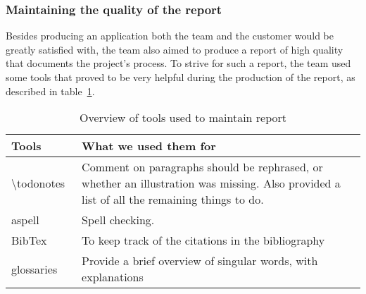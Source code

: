 \subsubsection{Maintaining the quality of the report}
Besides producing an application both the team and the customer would be greatly satisfied with, the team also aimed to produce a report of high quality that documents the project's process. To strive for such a report, the team used some tools that proved to be very helpful during the production of the report, as described in table~\ref{tab:reportTools}.

\begin{table}[H]
\begin{tabular}{|l|p{13cm}|}
\hline
\textbf{Tools} & \textbf{What we used them for}\\\hline
\textbackslash todonotes~\cite{todo}&Comment on paragraphs should be rephrased, or whether an illustration was missing. Also provided a list of all the remaining things to do.\\\hline
aspell~\cite{aspell} & Spell checking.\\\hline
BibTex~\cite{bibtex}&To keep track of the citations in the bibliography\\\hline
glossaries~\cite{glossaries}& Provide a brief overview of singular words, with explanations\\\hline
\end{tabular}
\caption{Overview of tools used to maintain report}
\label{tab:reportTools}
\end{table}

\begin{comment}
\noindent\textbf{\textbackslash todonotes}\\
Feedback is key when creating a product. The \textbackslash todonotes~\cite{todo} package allowed the team to comment on paragraphs and formulations we wanted to rephrase, whether an illustration was missing, and also gave us a list of all the things we had to do, making it easy to get an overview of the remaining tasks regarding the report.\\

\noindent\textbf{Spell checking: aspell}\\
Although manual proofreading cannot be avoided, it is advantageous to have a tool to perform automatic spell checking. Aspell~\cite{aspell} is such a tool.\\

\noindent\textbf{References and glossary}\\
To keep track of the citations in the bibliography in the report, we used a LaTeX-package called BibTex~\cite{bibtex}, and for our glossaries, a package called glossaries~\cite{glossaries}.

\end{comment}
